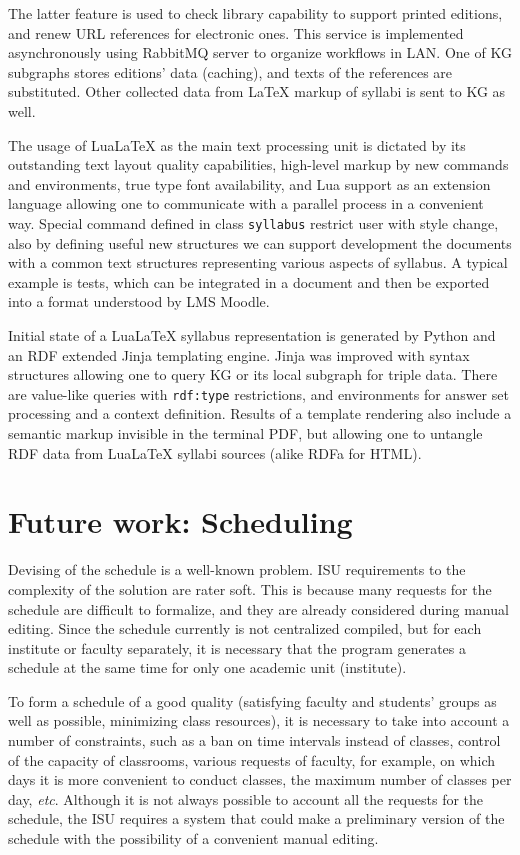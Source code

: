 \documentclass[
]{ceurart}
\providecommand{\LuaLaTeX}{Lua\LaTeX}
\begin{document}
The latter feature is used to check library capability to support printed editions, and renew URL references for electronic ones.  This service is implemented asynchronously using RabbitMQ server to organize workflows in LAN.  One of KG subgraphs stores editions' data (caching), and texts of the references are substituted.  Other collected data from \LaTeX{} markup of syllabi is sent to KG as well.

The usage of \LuaLaTeX{} as the main text processing unit is dictated by its outstanding text layout quality capabilities, high-level markup by new commands and environments, true type font availability, and Lua support as an extension language allowing one to communicate with a parallel process in a convenient way.  Special command defined in class \verb|syllabus| restrict user with style change, also by defining useful new structures we can support development the documents with a common text structures representing various aspects of syllabus.  A typical example is tests, which can be integrated in a document and then be exported into a format understood by LMS Moodle.

Initial state of a \LuaLaTeX{} syllabus representation is generated by Python and an RDF extended Jinja templating engine.  Jinja was improved with syntax structures allowing one to query KG or its local subgraph for triple data.  There are value-like queries with \verb|rdf:type| restrictions, and environments for answer set processing and a context definition.  Results of a template rendering also include a semantic markup invisible in the terminal PDF, but allowing one to untangle RDF data from \LuaLaTeX{} syllabi sources (alike RDFa for HTML).

\section{Future work: Scheduling}

Devising of the schedule is a well-known problem.  ISU requirements to the complexity of the solution are rater soft. This is because many requests for the schedule are difficult to formalize, and they are already considered during manual editing.  Since the schedule currently is not centralized compiled, but for each institute or faculty separately, it is necessary that the program generates a schedule at the same time for only one academic unit (institute).

To form a schedule of a good quality (satisfying faculty and students' groups as well as possible, minimizing class resources), it is necessary to take into account a number of constraints, such as a ban on time intervals instead of classes, control of the capacity of classrooms, various requests of faculty, for example, on which days it is more convenient to conduct classes, the maximum number of classes per day, \emph{etc}.  Although it is not always possible to account all the requests for the schedule, the ISU requires a system that could make a preliminary version of the schedule with the possibility of a convenient manual editing.
\end{document}

